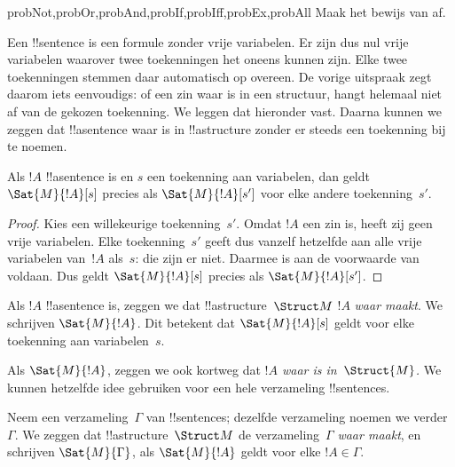 \documentclass[../../../include/open-logic-section]{subfiles}
\begin{document}
\begin{probtag}{probNot,probOr,probAnd,probIf,probIff,probEx,probAll}
Maak het bewijs van  af.
\end{probtag}

\begin{explain}
Een !!{sentence} is een formule zonder vrije variabelen. Er zijn dus
nul vrije variabelen waarover twee toekenningen het oneens kunnen
zijn. Elke twee toekenningen stemmen daar automatisch op overeen. De
vorige uitspraak zegt daarom iets eenvoudigs: of een zin waar is in
een structuur, hangt helemaal niet af van de gekozen toekenning. We
leggen dat hieronder vast. Daarna kunnen we zeggen dat !!a{sentence}
waar is in !!a{structure} zonder er steeds een toekenning bij te noemen.
\end{explain}

\begin{cor}
Als $!A$ !!a{sentence} is en $s$ een toekenning aan variabelen, dan
geldt $\Sat{M}{!A}[s]$ precies als $\Sat{M}{!A}[s']$ voor elke andere
toekenning~$s'$.
\end{cor}

\begin{proof}
  Kies een willekeurige toekenning~$s'$. Omdat $!A$ een zin is, heeft
  zij geen vrije variabelen. Elke toekenning~$s'$ geeft dus vanzelf
  hetzelfde aan alle vrije variabelen van~$!A$ als~$s$: die zijn er
  niet. Daarmee is aan de voorwaarde van
   voldaan. Dus geldt $\Sat{M}{!A}[s]$ precies als
  $\Sat{M}{!A}[s']$.
\end{proof}

\begin{defn}
Als $!A$ !!a{sentence} is, zeggen we dat !!a{structure}~$\Struct M$
$!A$ \emph{waar maakt}. We schrijven $\Sat{M}{!A}$. Dit betekent dat
$\Sat{M}{!A}[s]$ geldt voor elke toekenning aan variabelen~$s$.
\end{defn}

Als $\Sat{M}{!A}$, zeggen we ook kortweg dat \emph{$!A$ waar is
in~$\Struct{M}$.} We kunnen hetzelfde idee gebruiken voor een hele
verzameling !!{sentence}s.

\begin{defn}
Neem een verzameling~$\Gamma$ van !!{sentence}s; dezelfde verzameling
noemen we verder~$\Gamma$. We zeggen dat !!a{structure}~$\Struct M$
de verzameling~$\Gamma$ \emph{waar maakt},
en schrijven $\Sat{M}{\Gamma}$, als $\Sat{M}{!A}$ geldt voor elke
$!A \in \Gamma$.
\end{defn}
\end{document}
